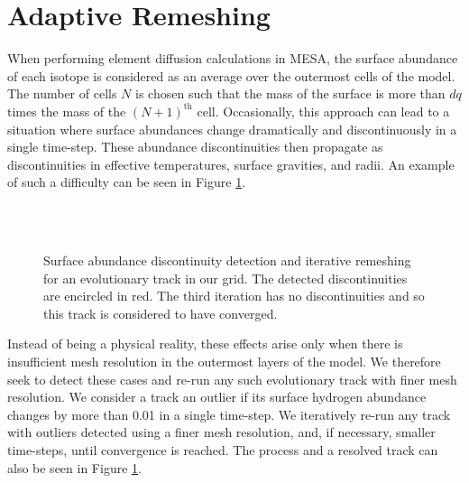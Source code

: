 \documentclass[manuscript]{aastex}
\begin{document}
\section{Adaptive Remeshing}
\label{sec:remeshing}

When performing element diffusion calculations in MESA, the surface abundance of each isotope is considered as an average over the outermost cells of the model. The number of cells $N$ is chosen such that the mass of the surface is more than $dq$ times the mass of the $(N+1)^{\text{th}}$ cell. Occasionally, this approach can lead to a situation where surface abundances change dramatically and discontinuously in a single time-step. These abundance discontinuities then propagate as discontinuities in effective temperatures, surface gravities, and radii. An example of such a difficulty can be seen in Figure \ref{fig:discontinuity}. 

\begin{figure}
    \centering
    \\
    \\
    \caption{Surface abundance discontinuity detection and iterative remeshing for an evolutionary track in our grid. The detected discontinuities are encircled in red. The third iteration has no discontinuities and so this track is considered to have converged. }
    \label{fig:discontinuity}
\end{figure}

Instead of being a physical reality, these effects arise only when there is insufficient mesh resolution in the outermost layers of the model. We therefore seek to detect these cases and re-run any such evolutionary track with finer mesh resolution. We consider a track an outlier if its surface hydrogen abundance changes by more than 0.01 in a single time-step. We iteratively re-run any track with outliers detected using a finer mesh resolution, and, if necessary, smaller time-steps, until convergence is reached. The process and a resolved track can also be seen in Figure \ref{fig:discontinuity}. 

\end{document}

